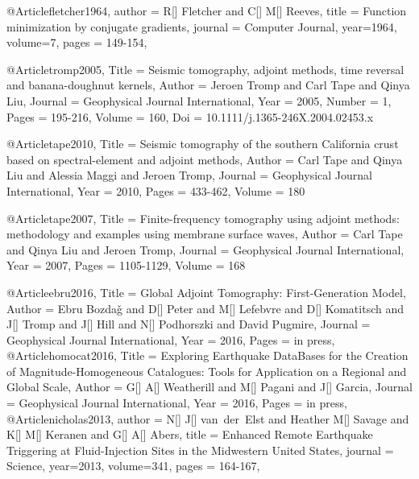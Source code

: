 @Article{fletcher1964,
  author =	 {R[] Fletcher and C[] M[] Reeves},
  title =	 {Function minimization by conjugate gradients},
  journal =	 {Computer Journal},
  year=1964,
  volume=7,
  pages =	 {149-154},
}

@Article{tromp2005,
  Title                    = {Seismic tomography, adjoint methods, time reversal and banana-doughnut kernels},
  Author                   = {Jeroen Tromp and Carl Tape and Qinya Liu},
  Journal                  = Geophysical Journal International,
  Year                     = {2005},
  Number                   = {1},
  Pages                    = {195-216},
  Volume                   = {160},
  Doi                      = {10.1111/j.1365-246X.2004.02453.x}
}

@Article{tape2010,
  Title                    = {Seismic tomography of the southern {C}alifornia crust based on spectral-element and adjoint methods},
  Author                   = {Carl Tape and Qinya Liu and Alessia Maggi and Jeroen Tromp},
  Journal                  = Geophysical Journal International,
  Year                     = {2010},
  Pages                    = {433-462},
  Volume                   = {180}
}

@Article{tape2007,
  Title                    = {Finite-frequency tomography using adjoint methods: methodology and examples using membrane surface waves},
  Author                   = {Carl Tape and Qinya Liu and Jeroen Tromp},
  Journal                  = Geophysical Journal International,
  Year                     = {2007},
  Pages                    = {1105-1129},
  Volume                   = {168}
}

@Article{ebru2016,
  Title                    = {Global Adjoint Tomography: First-Generation Model},
  Author                   = {Ebru Bozda\v{g} and D[] Peter and M[] Lefebvre and D[] Komatitsch and J[] Tromp and J[] Hill and N[] Podhorszki and David Pugmire},
  Journal                  = Geophysical Journal International,
  Year                     = {2016},
  Pages                    = {in press},
}
@Article{homocat2016,
  Title                    = {Exploring Earthquake DataBases for the Creation of Magnitude-Homogeneous Catalogues: Tools for Application on a Regional and Global Scale},
  Author                   = {G[] A[] Weatherill and M[] Pagani and J[] Garcia},
  Journal                  = {Geophysical Journal International},
  Year                     = {2016},
  Pages                    = {in press},
}
@Article{nicholas2013,
  author =	 {N[] J[] van~der~Elst and Heather M[] Savage and K[] M[] Keranen and G[] A[] Abers},
  title =	 {Enhanced Remote Earthquake Triggering at Fluid-Injection Sites in the Midwestern United States},
  journal =	 {Science},
  year=2013,
  volume=341,
  pages =	 {164-167},
}

